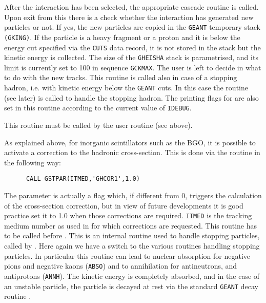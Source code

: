 After the interaction has been selected, 
the appropriate cascade routine is called. Upon exit from this
there is a check whether the interaction has generated new particles or not. If
yes, the new particles are copied in the {\tt GEANT} temporary stack
{\tt (GKING)}. If the particle is a heavy fragment or a proton and it is below
the energy cut specified via the {\tt CUTS} data record, it is not stored in the
stack but the kinetic energy is collected. The size of the {\tt GHEISHA}
stack is parametrised, and its limit is currently set to 100 in sequence
{\tt GCKMAX}. The
user is left to decide in  what to do with
the new tracks. This routine is called also in case of a stopping hadron,
i.e. with kinetic energy below the {\tt GEANT} cuts.
In this case the routine
 (see later)
is called to handle the stopping hadron. The printing flags for
 are also set in this routine according to the current value
of {\tt IDEBUG}.
 
This routine must be called by the user routine  (see above).
 
As explained above, for inorganic scintillators such as the BGO, it is
possible to activate a correction to the hadronic cross-section. This is
done via the routine  in the following way:
\begin{verbatim}
      CALL GSTPAR(ITMED,'GHCOR1',1.0)
\end{verbatim}
The parameter is actually a flag which, if different from 0, triggers
the calculation of the cross-section correction, but in view of future
developments it is good practice set it to 1.0 when those corrections are
required. {\tt ITMED} is the tracking medium number as used in
 for which corrections are requested. This routine has
to be called before .
This is an internal routine used to handle stopping particles, called
by . Here again we have a switch to the various routines
handling stopping particles. In particular this routine can lead to
nuclear absorption for negative pions and negative kaons ({\tt ABSO}) 
and to
annihilation for antineutrons, and antiprotons ({\tt ANNH}). The kinetic
energy is completely absorbed, and in the case of an unstable particle, the
particle is decayed at rest via the standard {\tt GEANT} decay routine
.
 
